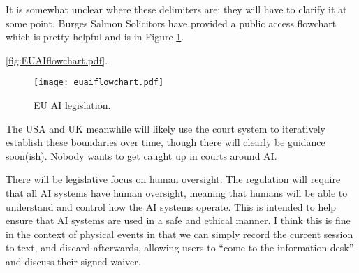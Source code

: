 It is somewhat unclear where these delimiters are; they will have to clarify it at some point. Burges Salmon Solicitors have provided a public access flowchart which is pretty helpful and is in Figure \ref{fig:euaiflowchart}.

\ref{fig:EUAIflowchart.pdf}. 
\begin{figure}[H]
    \centering
    \texttt{[image: euaiflowchart.pdf]}
    \caption{EU AI legislation.}
    \label{fig:euaiflowchart}
\end{figure}


The USA and UK meanwhile will likely use the court system to iteratively establish these boundaries over time, though there will clearly be guidance soon(ish). Nobody wants to get caught up in courts around AI.

There will be legislative focus on human oversight. The regulation will require that all AI systems have human oversight, meaning that humans will be able to understand and control how the AI systems operate. This is intended to help ensure that AI systems are used in a safe and ethical manner. I think this is fine in the context of physical events in that we can simply record the current session to text, and discard afterwards, allowing users to ``come to the information desk'' and discuss their signed waiver. \par 


